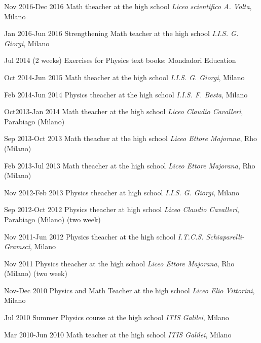 \begin{CV}
\item[Nov 2016-Dec 2016] Math theacher at the high school {\em Liceo scientifico A. Volta}, Milano

\item[Jan 2016-Jun 2016] Strengthening Math teacher at the high school {\em I.I.S. G. Giorgi}, Milano
	
\item[Jul 2014 (2 weeks)] Exercises for Physics text books: Mondadori Education

\item[Oct 2014-Jun 2015] Math theacher at the high school {\em I.I.S. G. Giorgi}, Milano

\item[Feb 2014-Jun 2014] Physics theacher at the high school {\em I.I.S. F. Besta}, Milano

\item[Oct2013-Jan 2014] Math theacher at the high school {\em Liceo Claudio Cavalleri}, Parabiago (Milano)

\item[Sep 2013-Oct 2013] Math theacher at the high school {\em Liceo Ettore Majorana}, Rho (Milano)

\item[Feb 2013-Jul 2013] Math theacher at the high school {\em Liceo Ettore Majorana}, Rho (Milano)

\item[Nov 2012-Feb 2013] Physics theacher at high school {\em I.I.S. G. Giorgi}, Milano

\item[Sep 2012-Oct 2012] Physics theacher at high school {\em Liceo Claudio Cavalleri}, Parabiago (Milano) (two week)

\item[Nov 2011-Jun 2012] Physics theacher at the high school {\em I.T.C.S. Schiaparelli-Gramsci}, Milano

\item[Nov 2011] Physics theacher at the high school {\em Liceo Ettore Majorana}, Rho (Milano) (two week)

\item[Nov-Dec 2010] Physics and Math Teacher at the high school {\em Liceo Elio Vittorini}, Milano

\item[Jul 2010] Summer Physics course at the high school {\em ITIS Galilei}, Milano

\item[Mar 2010-Jun 2010] Math teacher at the high school {\em ITIS Galilei}, Milano


\end{CV}
